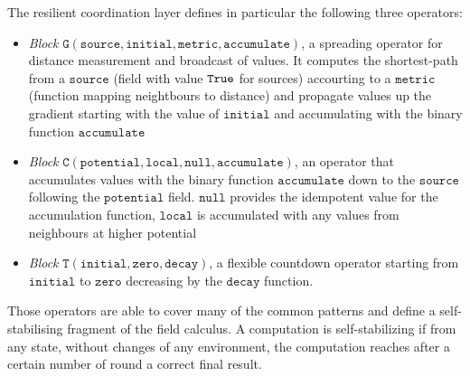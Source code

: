 The resilient coordination layer defines in particular the following three operators:
\begin{itemize}
\item \textit{Block} $\mathtt{G(source, initial, metric, accumulate)}$, a spreading operator for distance measurement and broadcast of values. It computes the shortest-path from a $\mathtt{source}$ (field with value $\mathtt{True}$ for sources) accourting to a $\mathtt{metric}$ (function mapping neightbours to distance) and propagate values up the gradient starting with the value of $\mathtt{initial}$ and accumulating with the binary function $\mathtt{accumulate}$
\item \textit{Block} $\mathtt{C(potential, local, null, accumulate)}$, an operator that accumulates values with the binary function $\mathtt{accumulate}$ down to the $\mathtt{source}$ following the $\mathtt{potential}$ field. $\mathtt{null}$ provides the idempotent value for the accumulation function, $\mathtt{local}$ is accumulated with any values from neighbours at higher potential
\item \textit{Block} $\mathtt{T(initial, zero, decay)}$, a flexible countdown operator starting from $\mathtt{initial}$ to $\mathtt{zero}$ decreasing by the $\mathtt{decay}$ function.
\end{itemize}

Those operators are able to cover many of the common patterns and define a self-stabilising fragment of the field calculus. A computation is self-stabilizing if from any state, without changes of any environment, the computation reaches after a certain number of round a correct final result.

